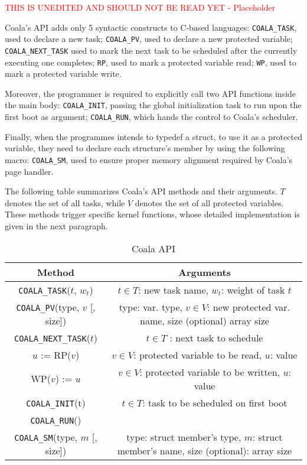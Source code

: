 \textcolor{red}{THIS IS UNEDITED AND SHOULD NOT BE READ YET - Placeholder}
	
Coala's API adds only 5 syntactic constructs to C-based languages: \texttt{COALA\_TASK}, used to declare a new task; \texttt{COALA\_PV}, used to declare a new protected variable; \texttt{COALA\_NEXT\_TASK} used to mark the next task to be scheduled after the currently executing one completes; \texttt{RP}, used to mark a protected variable read; \texttt{WP}, used to mark a protected variable write.

Moreover, the programmer is required to explicitly call two API functions inside the main body: \texttt{COALA\_INIT}, passing the global initialization task to run upon the first boot as argument; \texttt{COALA\_RUN}, which hands the control to Coala's scheduler.

Finally, when the programmes intends to typedef a struct, to use it as a protected variable, they need to declare each structure's member by using the following macro: \texttt{COALA\_SM}, used to ensure proper memory alignment required by Coala's page handler.

The following table summarizes Coala's API methods and their arguments. $T$ denotes the set of all tasks, while $V$ denotes the set of all protected variables. These methods trigger specific kernel functions, whose detailed implementation is given in the next paragraph.

\begin{table}
\centering
\begin{tabular}{| c | c |}
	\hline
	\textbf{Method} & \textbf{Arguments} \\
	\hline\hline
	\texttt{COALA\_TASK}($t$, $w_t$) & $t \in T$: new task name, $w_t$: weight of task $t$ \\
	\hline
	\texttt{COALA\_PV}(type, $v$ [, size]) & type: var. type, $v \in V$: new protected var. name, size (optional)  array size\\
	\hline
	\texttt{COALA\_NEXT\_TASK}($t$) & $t \in T$ : next task to schedule\\
	\hline
	$u$ := RP($v$) & $v \in V$: protected variable to be read, $u$: value \\
	\hline	
	WP($v$) := $u$ &  $v \in V$: protected variable to be written, $u$: value \\
	\hline
	\texttt{COALA\_INIT}(t) & $t \in T$: task to be scheduled on first boot \\
	\hline
	\texttt{COALA\_RUN}() & {} \\
	\hline
	\texttt{COALA\_SM}(type, $m$ [, size]) &  type: struct member's type, $m$: struct member's name, size (optional): array size \\
	\hline
\end{tabular}
\caption{Coala API}
\label{table:coala_api}
\end{table}

